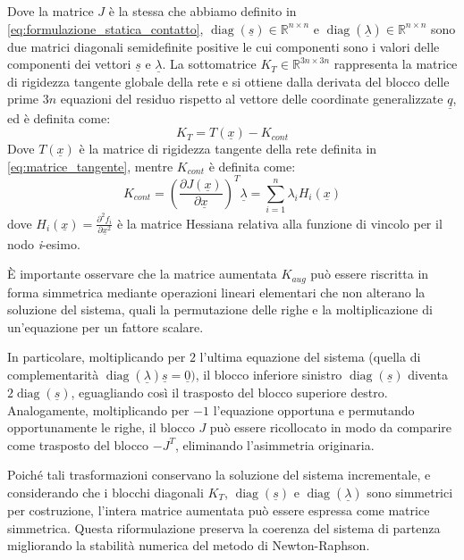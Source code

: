 Dove la matrice $J$ è la stessa che abbiamo definito in \eqref{eq:formulazione_statica_contatto}, $\operatorname{diag}(\underline{s}) \in \mathbb{R}^{n \times n}$ e $\operatorname{diag}(\underline{\lambda}) \in \mathbb{R}^{n \times n}$ sono due matrici diagonali semidefinite positive le cui componenti sono i valori delle componenti dei vettori $\underline{s}$ e $\underline{\lambda}$. La sottomatrice $K_T \in \mathbb{R}^{3n\times3n}$ rappresenta la matrice di rigidezza tangente globale della rete e si ottiene dalla derivata del blocco delle prime $3n$ equazioni del residuo rispetto al vettore delle coordinate generalizzate $\underline{q}$, ed è definita come:
\begin{equation}
  K_{T} = T(\underline{x}) - K_{cont} 
  \label{eq:matrice_rigidezza_aumentata_sottoblocco}
\end{equation}
Dove $T(\underline{x})$ è la matrice di rigidezza tangente della rete definita in \eqref{eq:matrice_tangente}, mentre $K_{cont}$ è definita come:
\begin{equation}
  K_{cont} = \left(\frac{\partial J(\underline{x})}{\partial \underline{x}}\right)^T \underline{\lambda} = \sum_{i=1}^{n} \lambda_i H_i(\underline{x})
  \label{eq:matrice_rigidezza_contatto}
\end{equation}
dove $H_i(\underline{x}) = \frac{\partial^2 f_i}{\partial \underline{x}^2}$ è la matrice Hessiana relativa alla funzione di vincolo per il nodo \textit{i}-esimo. 

\`E importante osservare che la matrice aumentata $K_{aug}$ può essere riscritta in forma simmetrica mediante operazioni lineari elementari che non alterano la soluzione del sistema, quali la permutazione delle righe e la moltiplicazione di un'equazione per un fattore scalare. 

In particolare, moltiplicando per $2$ l'ultima equazione del sistema (quella di complementarità $\operatorname{diag}(\underline{\lambda})\underline{s} = \underline{0})$, il blocco inferiore sinistro $\operatorname{diag}(\underline{s})$ diventa $2\operatorname{diag}(\underline{s})$, eguagliando così il trasposto del blocco superiore destro. Analogamente, moltiplicando per $-1$ l'equazione opportuna e permutando opportunamente le righe, il blocco $J$ può essere ricollocato in modo da comparire come trasposto del blocco $-J^T$, eliminando l'asimmetria originaria.

Poiché tali trasformazioni conservano la soluzione del sistema incrementale, e considerando che i blocchi diagonali $K_T$, $\operatorname{diag}(\underline{s})$ e $\operatorname{diag}(\underline{\lambda})$ sono simmetrici per costruzione, l'intera matrice aumentata può essere espressa come matrice simmetrica. Questa riformulazione preserva la coerenza del sistema di partenza migliorando la stabilità numerica del metodo di Newton-Raphson. 

